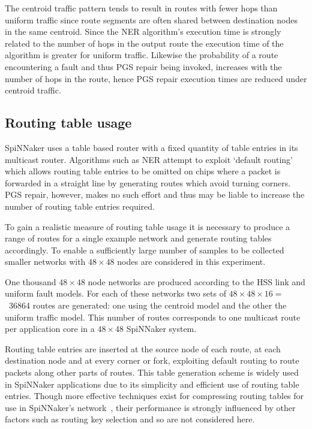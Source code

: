 			The centroid traffic pattern tends to result in routes with fewer hops
			than uniform traffic since route segments are often shared between
			destination nodes in the same centroid.  Since the NER algorithm's
			execution time is strongly related to the number of hops in the output
			route the execution time of the algorithm is greater for uniform traffic.
			Likewise the probability of a route encountering a fault and thus PGS
			repair being invoked, increases with the number of hops in the route,
			hence PGS repair execution times are reduced under centroid traffic.
		
		\subsection{Routing table usage}
			
			SpiNNaker uses a table based router with a fixed quantity of table
			entries in its multicast router. Algorithms such as NER attempt to
			exploit `default routing' which allows routing table entries to be
			omitted on chips where a packet is forwarded in a straight line by
			generating routes which avoid turning corners.  PGS repair, however,
			makes no such effort and thus may be liable to increase the number of
			routing table entries required.
			
			To gain a realistic measure of routing table usage it is necessary to
			produce a range of routes for a single example network and generate
			routing tables accordingly.  To enable a sufficiently large number of
			samples to be collected smaller networks with $48\times48$ nodes are
			considered in this experiment.
			
			One thousand $48\times48$ node networks are produced according to the HSS
			link and uniform fault models. For each of these networks two sets of
			$48\times48\times16=$~\num{36864} routes are generated: one using the
			centroid model and the other the uniform traffic model. This number of
			routes corresponds to one multicast route per application core in a
			$48\times48$ SpiNNaker system.
			
			Routing table entries are inserted at the source node of each route, at
			each destination node and at every corner or fork, exploiting default
			routing to route packets along other parts of routes. This table
			generation scheme is widely used in SpiNNaker applications due to its
			simplicity and efficient use of routing table entries. Though more
			effective techniques exist for compressing routing tables for use in
			SpiNNaker's network~\cite{mundy16}, their performance is strongly
			influenced by other factors such as routing key selection and so are not
			considered here.
			
